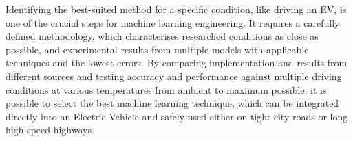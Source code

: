 %
Identifying the best-suited method for a specific condition, like driving an EV, is one of the crucial steps for machine learning engineering.
It requires a carefully defined methodology, which characterises researched conditions as close as possible, and experimental results from multiple models with applicable techniques and the lowest errors.
By comparing implementation and results from different sources and testing accuracy and performance against multiple driving conditions at various temperatures from ambient to maximum possible, it is possible to select the best machine learning technique, which can be integrated directly into an Electric Vehicle and safely used either on tight city roads or long high-speed highways.
%
